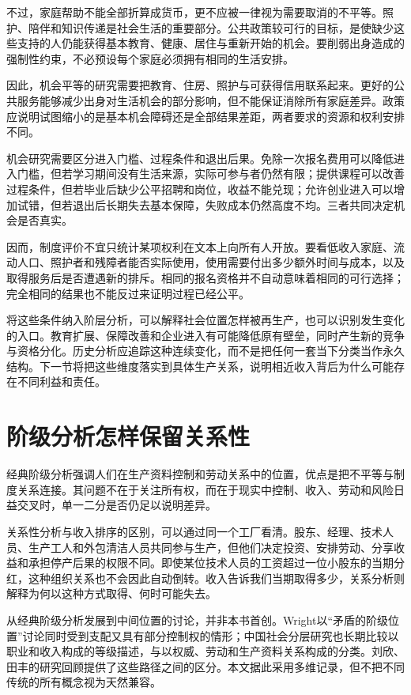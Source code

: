 \documentclass[UTF8,fontset=fandol,zihao=-4,oneside,openany]{ctexbook}
\begin{document}
不过，家庭帮助不能全部折算成货币，更不应被一律视为需要取消的不平等。照护、陪伴和知识传递是社会生活的重要部分。公共政策较可行的目标，是使缺少这些支持的人仍能获得基本教育、健康、居住与重新开始的机会。要削弱出身造成的强制性约束，不必预设每个家庭必须拥有相同的生活安排。

因此，机会平等的研究需要把教育、住房、照护与可获得信用联系起来。更好的公共服务能够减少出身对生活机会的部分影响，但不能保证消除所有家庭差异。政策应说明试图缩小的是基本机会障碍还是全部结果差距，两者要求的资源和权利安排不同。

\label{arg:P170}
机会研究需要区分进入门槛、过程条件和退出后果。免除一次报名费用可以降低进入门槛，但若学习期间没有生活来源，实际可参与者仍然有限；提供课程可以改善过程条件，但若毕业后缺少公平招聘和岗位，收益不能兑现；允许创业进入可以增加试错，但若退出后长期失去基本保障，失败成本仍然高度不均。三者共同决定机会是否真实。

因而，制度评价不宜只统计某项权利在文本上向所有人开放。要看低收入家庭、流动人口、照护者和残障者能否实际使用，使用需要付出多少额外时间与成本，以及取得服务后是否遭遇新的排斥。相同的报名资格并不自动意味着相同的可行选择；完全相同的结果也不能反过来证明过程已经公平。

将这些条件纳入阶层分析，可以解释社会位置怎样被再生产，也可以识别发生变化的入口。教育扩展、保障改善和企业进入有可能降低原有壁垒，同时产生新的竞争与资格分化。历史分析应追踪这种连续变化，而不是把任何一套当下分类当作永久结构。下一节将把这些维度落实到具体生产关系，说明相近收入背后为什么可能存在不同利益和责任。

\section{阶级分析怎样保留关系性}
经典阶级分析强调人们在生产资料控制和劳动关系中的位置，优点是把不平等与制度关系连接。其问题不在于关注所有权，而在于现实中控制、收入、劳动和风险日益交叉时，单一二分是否仍足以说明差异。

\label{arg:P171}
关系性分析与收入排序的区别，可以通过同一个工厂看清。股东、经理、技术人员、生产工人和外包清洁人员共同参与生产，但他们决定投资、安排劳动、分享收益和承担停产后果的权限不同。即使某位技术人员的工资超过一位小股东的当期分红，这种组织关系也不会因此自动倒转。收入告诉我们当期取得多少，关系分析则解释为何以这种方式取得、何时可能失去。

从经典阶级分析发展到中间位置的讨论，并非本书首创。Wright以“矛盾的阶级位置”讨论同时受到支配又具有部分控制权的情形；中国社会分层研究也长期比较以职业和收入构成的等级描述，与以权威、劳动和生产资料关系构成的分类。刘欣、田丰的研究回顾提供了这些路径之间的区分。本文据此采用多维记录，但不把不同传统的所有概念视为天然兼容。\cite{Wright1985,LiuTian2018}
\end{document}
